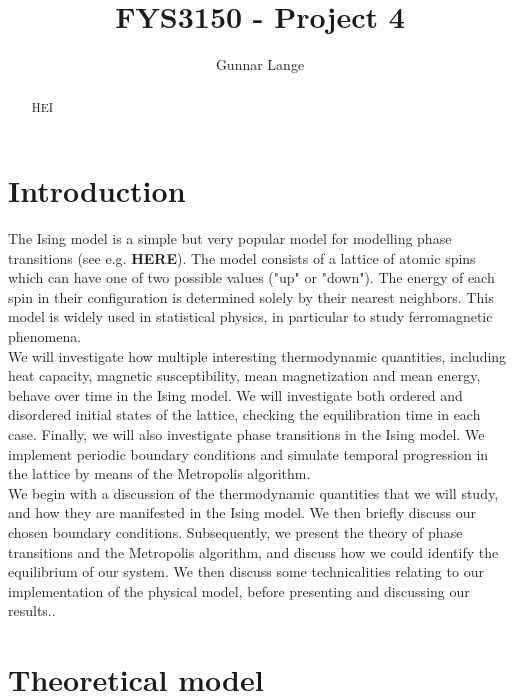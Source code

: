 \documentclass[a4paper, 10pt]{article}
\title{FYS3150 - Project 4}
\author{Gunnar Lange}
\begin{document}
\maketitle
\begin{abstract}
HEI
\end{abstract}
\tableofcontents
\section{Introduction}
The Ising model is a simple but very popular model for modelling phase transitions (see e.g. \textbf{HERE}). The model consists of a lattice of atomic spins which can have one of two possible values ("up" or "down"). The energy of each spin in their configuration is determined solely by their nearest neighbors. This model is widely used in statistical physics, in particular to study ferromagnetic phenomena.\\
\linebreak
We will investigate how multiple interesting thermodynamic quantities, including heat capacity, magnetic susceptibility, mean magnetization and mean energy, behave over time in the Ising model. We will investigate both ordered and disordered initial states of the lattice, checking the equilibration time in each case. Finally, we will also investigate phase transitions in the Ising model. We implement periodic boundary conditions and simulate temporal progression in the lattice by means of the Metropolis algorithm.\\
\linebreak
We begin with a discussion of the thermodynamic quantities that we will study, and how they are manifested in the Ising model. We then briefly discuss our chosen boundary conditions. Subsequently, we present the theory of phase transitions and the Metropolis algorithm, and discuss how we could identify the equilibrium of our system. We then discuss some technicalities relating to our implementation of the physical model, before presenting and discussing our results..
\section{Theoretical model}
\end{document}

